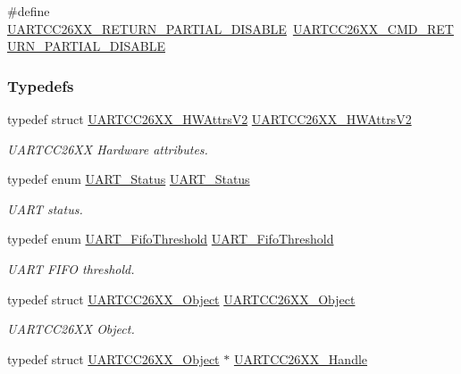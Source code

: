 \begin{DoxyCompactItemize}
\item 
\#define \hyperlink{_u_a_r_t_c_c26_x_x_8h_a973b0815d1f88dc3f3e7191625783b99}{U\+A\+R\+T\+C\+C26\+X\+X\+\_\+\+R\+E\+T\+U\+R\+N\+\_\+\+P\+A\+R\+T\+I\+A\+L\+\_\+\+D\+I\+S\+A\+B\+L\+E}~\hyperlink{group___u_a_r_t___c_m_d_ga7cc7c1551022a60bd310c79acb6b26b8}{U\+A\+R\+T\+C\+C26\+X\+X\+\_\+\+C\+M\+D\+\_\+\+R\+E\+T\+U\+R\+N\+\_\+\+P\+A\+R\+T\+I\+A\+L\+\_\+\+D\+I\+S\+A\+B\+L\+E}
\end{DoxyCompactItemize}
\subsubsection*{Typedefs}
\begin{DoxyCompactItemize}
\item 
typedef struct \hyperlink{struct_u_a_r_t_c_c26_x_x___h_w_attrs_v2}{U\+A\+R\+T\+C\+C26\+X\+X\+\_\+\+H\+W\+Attrs\+V2} \hyperlink{_u_a_r_t_c_c26_x_x_8h_a8fdb76e26490beca00f33d3f918ce0dc}{U\+A\+R\+T\+C\+C26\+X\+X\+\_\+\+H\+W\+Attrs\+V2}
\begin{DoxyCompactList}\small\item\em U\+A\+R\+T\+C\+C26\+X\+X Hardware attributes. \end{DoxyCompactList}\item 
typedef enum \hyperlink{_u_a_r_t_c_c26_x_x_8h_a778bbef5f4b52a5651552136715f53c4}{U\+A\+R\+T\+\_\+\+Status} \hyperlink{_u_a_r_t_c_c26_x_x_8h_a27818b82da9cf35d1f0f228b1f69b036}{U\+A\+R\+T\+\_\+\+Status}
\begin{DoxyCompactList}\small\item\em U\+A\+R\+T status. \end{DoxyCompactList}\item 
typedef enum \hyperlink{_u_a_r_t_c_c26_x_x_8h_a292a5e751577698b215f5e8aa1c79e99}{U\+A\+R\+T\+\_\+\+Fifo\+Threshold} \hyperlink{_u_a_r_t_c_c26_x_x_8h_a9169576296a1811855ec75dce0f8e316}{U\+A\+R\+T\+\_\+\+Fifo\+Threshold}
\begin{DoxyCompactList}\small\item\em U\+A\+R\+T F\+I\+F\+O threshold. \end{DoxyCompactList}\item 
typedef struct \hyperlink{struct_u_a_r_t_c_c26_x_x___object}{U\+A\+R\+T\+C\+C26\+X\+X\+\_\+\+Object} \hyperlink{_u_a_r_t_c_c26_x_x_8h_a41437180bc6a286da889dc2aae1c001c}{U\+A\+R\+T\+C\+C26\+X\+X\+\_\+\+Object}
\begin{DoxyCompactList}\small\item\em U\+A\+R\+T\+C\+C26\+X\+X Object. \end{DoxyCompactList}\item 
typedef struct \hyperlink{struct_u_a_r_t_c_c26_x_x___object}{U\+A\+R\+T\+C\+C26\+X\+X\+\_\+\+Object} $\ast$ \hyperlink{_u_a_r_t_c_c26_x_x_8h_a276d493f1689ad8c16b5cfb4dada194a}{U\+A\+R\+T\+C\+C26\+X\+X\+\_\+\+Handle}
\end{DoxyCompactItemize}
